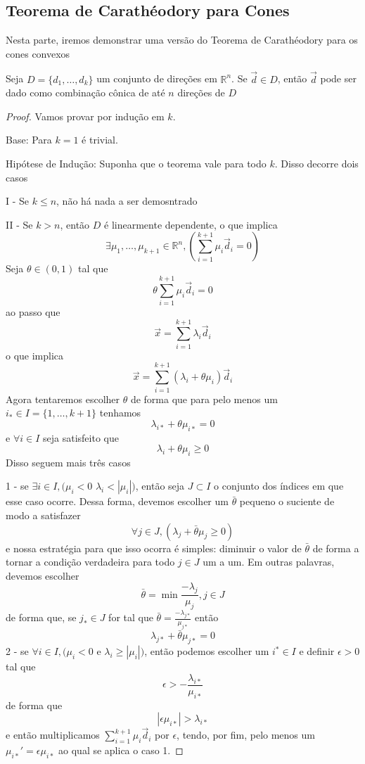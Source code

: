 \subsection{Teorema de Carathéodory para Cones}

Nesta parte, iremos demonstrar uma versão do Teorema de Carathéodory para os
cones convexos

\begin{thm:caratheodory cones}
  Seja $D = \{d_1, \dots, d_k\}$ um conjunto de direções em $\mathbb{R}^n$. Se $\vec{d} \in D$, então
  $\vec{d}$ pode ser dado como combinação cônica de até $n$ direções
  de $D$

  \begin{proof}
   Vamos provar por indução em $k$.

   Base: Para $k=1$ é trivial.

   Hipótese de Indução: Suponha que o teorema vale para todo $k$. Disso decorre
   dois casos

   I - Se $k \leq n$, não há nada a ser demosntrado

   II - Se $k > n$, então $D$ é linearmente dependente, o que implica
   \[
     \exists \mu_1, \dots, \mu_{k+1} \in \mathbb{R}^n, \left(\sum_{i=1}^{k+1}\mu_i \vec{d}_i = 0\right)
   \]
   Seja $\theta \in (0, 1)$ tal que
   \[
     \theta \sum_{i=1}^{k+1} \mu_i \vec{d}_i = 0
   \]
   ao passo que
   \[
     \vec{x} = \sum_{i=1}^{k+1}\lambda_i\vec{d}_i
   \]
   o que implica
   \[
     \vec{x} = \sum_{i=1}^{k+1}(\lambda_i + \theta \mu_i)\vec{d}_i
   \]
   Agora tentaremos escolher $\theta$ de forma que para pelo menos um
   $i_{*} \in I = \{1, \dots, k+1\}$ tenhamos
   \[
     \lambda_{i*} + \theta \mu_{i*} = 0
   \]
   e $\forall i \in I$ seja satisfeito que
   \[
     \lambda_i  + \theta \mu_i \geq 0
   \]Disso seguem mais três casos

   1 - se $\exists i \in I, (\mu_i < 0$  $\lambda_i < |\mu_i|)$,
   então seja $J \subset I$ o conjunto dos índices em que esse caso ocorre.
   Dessa forma, devemos escolher um $\bar{\theta}$ pequeno o suciente
   de modo a satisfazer
   \begin{equation*}
     \forall j \in J, (\lambda_j + \bar{\theta} \mu_j \geq 0)
   \end{equation*}
   e nossa estratégia para que isso ocorra é simples: diminuir o valor de
   $\bar{\theta}$ de forma a tornar a condição verdadeira para todo $j \in J$
   um a um. Em outras palavras, devemos escolher
   \[
     \bar{\theta} = \min{\frac{-\lambda_j}{\mu_j}, j \in J}
   \]
   de forma que, se $j_{*} \in J$ for tal que $\bar{\theta} = \frac{-\lambda_{j*}}{\mu_{j*}}$
   então
   \[
     \lambda_{j*} + \bar{\theta} \mu_{j*} = 0
   \]
   2 - se $\forall i \in I, (\mu_i < 0$ e $\lambda_i \geq |\mu_i|)$,
   então podemos escolher um $i^{*} \in I$ e definir $\epsilon>0$ tal que
   \[
     \epsilon > -\frac{\lambda_{i*}}{\mu_{i*}}
   \]
   de forma que
   \[
     |\epsilon \mu_{i*}| > \lambda_{i*}
   \]
   e então multiplicamos $\sum_{i=1}^{k+1} \mu_i \vec{d}_i$ por $\epsilon$,
   tendo, por fim, pelo menos um $\mu_{i*}' = \epsilon \mu_{i*}$ ao qual se aplica o
   caso 1.


\end{proof}
\end{thm:caratheodory cones}
